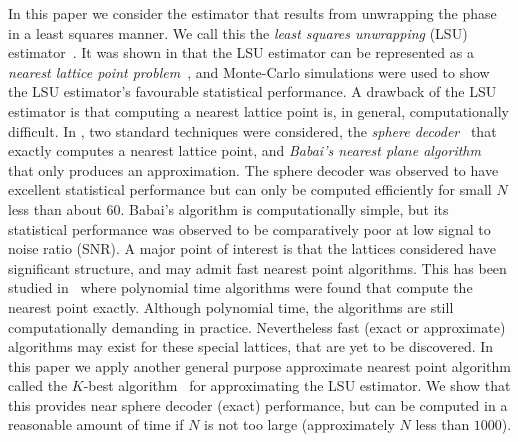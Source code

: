 \documentclass[journal]{IEEEtran}
\begin{document}
In this paper we consider the estimator that results from unwrapping the phase in a least squares manner.  We call this the \emph{least squares unwrapping} (LSU) estimator~\cite{McKilliam2009asilomar_polyest_lattice, McKilliamFrequencyEstimationByPhaseUnwrapping2009,McKilliam2010thesis}.  It was shown in \cite{McKilliam2009asilomar_polyest_lattice, McKilliamFrequencyEstimationByPhaseUnwrapping2009} that the LSU estimator can be represented as a \emph{nearest lattice point problem}~\cite{Agrell2002}, and Monte-Carlo simulations were used to show the LSU estimator's favourable statistical performance. %
A drawback of the LSU estimator is that computing a nearest lattice point is, in general, computationally difficult.  In \cite{McKilliam2009asilomar_polyest_lattice}, two standard techniques were considered, the \emph{sphere decoder}~\cite{Pohst_sphere_decoder_1981,Viterbo_sphere_decoder_1999,Agrell2002} that exactly computes a nearest lattice point, and \emph{Babai's nearest plane algorithm}~\cite{Babai1986} that only produces an approximation. The sphere decoder was observed to have excellent statistical performance but can only be computed efficiently for small $N$ less than about $60$.  Babai's algorithm is computationally simple, but its statistical performance was observed to be comparatively poor at low signal to noise ratio (SNR). A major point of interest is that the lattices considered have significant structure, and may admit fast nearest point algorithms.  This has been studied in~\cite{McKilliam2010thesis} where polynomial time algorithms were found that compute the nearest point exactly.  Although polynomial time, the algorithms are still computationally demanding in practice.  Nevertheless fast (exact or approximate) algorithms may exist for these special lattices, that are yet to be discovered.  In this paper we apply another general purpose approximate nearest point algorithm called the $K$-best algorithm~\cite{Baro_list_sphere_dec_2003,Zhan2006_K_best_sphere_decoder,Mondal_Kbest_again_2009} for approximating the LSU estimator.  We show that this provides near sphere decoder (exact) performance, but can be computed in a reasonable amount of time if $N$ is not too large (approximately $N$ less than $1000$).  %
\end{document}
